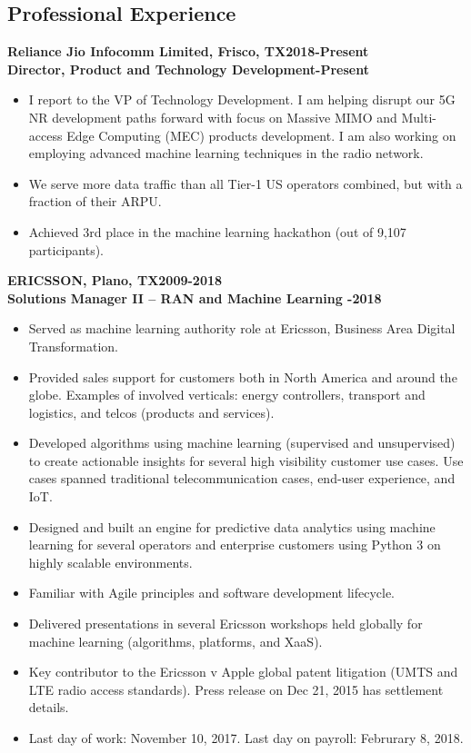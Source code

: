 \documentclass{article}
\begin{document}
\subsection*{\sc \centering Professional Experience}
\textbf{Reliance Jio Infocomm Limited, Frisco, TX\hfill 2018-Present}\\
\textbf{Director, Product and Technology Development\hfill {}-Present}
\begin{itemize}
\item I report to the VP of Technology Development. I am helping disrupt our 5G NR development paths forward with focus on Massive MIMO and Multi-access Edge Computing (MEC) products development. I am also working on employing advanced machine learning techniques in the radio network.
\item We serve more data traffic than all Tier-1 US operators combined, but with a fraction of their ARPU.
\item Achieved 3rd place in the machine learning hackathon (out of 9,107 participants).
\end{itemize}
\textbf{ERICSSON, Plano, TX\hfill 2009-2018}\\
\textbf{Solutions Manager II -- RAN and Machine Learning \hfill{}-2018}
\begin{itemize}
\item Served as machine learning authority role at Ericsson, Business Area Digital Transformation. 
\item Provided sales support for customers both in North America and around the globe. Examples of involved verticals: energy controllers, transport and logistics, and telcos (products and services).
\item Developed algorithms using machine learning (supervised and unsupervised) to create actionable insights for several high visibility customer use cases. Use cases spanned traditional telecommunication cases, end-user experience, and IoT. 
\item Designed and built an engine for predictive data analytics using machine learning for several operators and enterprise customers using Python 3 on highly scalable environments.%
\item Familiar with Agile principles and software development lifecycle.
\item Delivered presentations in several Ericsson workshops held globally for machine learning (algorithms, platforms, and XaaS). 
\item Key contributor to the Ericsson v Apple global patent litigation (UMTS and LTE radio access standards). Press release on Dec 21, 2015 has settlement details.
\item Last day of work: November 10, 2017.  Last day on payroll: Februrary 8, 2018.
\end{itemize}
\end{document}
